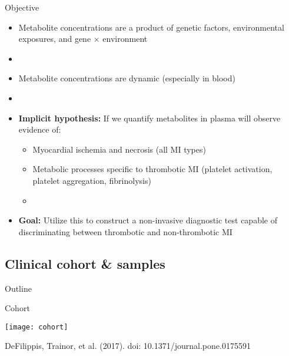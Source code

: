 \documentclass[xcolor=dvipsnames]{beamer}
\begin{document}
\begin{frame}{Objective}
	\vspace{-10pt}
	\begin{itemize}
		\item Metabolite concentrations are a product of genetic factors, environmental exposures, and gene $\times$ environment \pause
		\item[]
		\item Metabolite concentrations are dynamic (especially in blood) \pause
		\item[]
		\item \textbf{Implicit hypothesis:} If we quantify metabolites in plasma will observe evidence of:
		\begin{itemize}
			\item Myocardial ischemia and necrosis (all MI types)
			\item Metabolic processes specific to thrombotic MI (platelet activation, platelet aggregation, fibrinolysis) \pause
			\item[]
		\end{itemize}
		\item \textbf{Goal:} Utilize this to construct a non-invasive diagnostic test capable of discriminating between thrombotic and non-thrombotic MI
	\end{itemize}
\end{frame}

\subsection{Clinical cohort \& samples}
\begin{frame}{Outline}
	\vspace{-10.5pt}
	\tableofcontents[currentsection,subsectionstyle=show/shaded/hide]
\end{frame}

\begin{frame}{Cohort}
	\vspace{-10pt}
	\begin{center}
		\texttt{[image: cohort]}
		
		DeFilippis, Trainor, et al. (2017). doi: 10.1371/journal.pone.0175591
	\end{center}
\end{frame}
\end{document}
